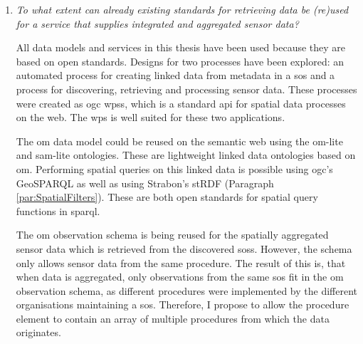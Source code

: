 \begin{enumerate}
However, the down side of the a detailed semantic knowledge base is that more data has to be transferred over the internet. First a \ac{sparql} query has to be made with a spatial filter, which includes verbose \ac{wkt} geometries. Then an \ac{rdf} document containing detailed information about each sensor is return, based on which \ac{sos} requests are performed. If only the addresses of \aclp{sos} are returned, which have sensors inside a certain bounding box, both the \ac{sparql} requests and responses are smaller. The detailed spatial query is then performed by the \aclp{sos} and does not require as much data to be transferred over the internet. 

Still, discovering sensors is only a matter of seconds using the a detailed semantic knowledge base. Automatically retrieving sensor data can take up to a couple minutes depending on the amount of sensors for which data is requested and the temporal range. However, it should be noted that performance optimisation is out of the scope of this thesis. It is likely that this can still be improved significantly in the future (see Chapter \ref{chap:futureResearch}).              

\item \textit{To what extent can already existing standards for retrieving data be (re)used for a service that supplies integrated and aggregated sensor data?}%

All data models and services in this thesis have been used because they are based on open standards. Designs for two processes have been explored: an automated process for creating linked data from metadata in a \ac{sos} and a process for discovering, retrieving and processing sensor data. These processes were created as \ac{ogc} \aclp{wps}, which is a standard \ac{api} for spatial data processes on the web. The \ac{wps} is well suited for these two applications.

The \ac{om} data model could be reused on the semantic web using the om-lite and sam-lite ontologies. These are lightweight linked data ontologies based on \ac{om}. Performing spatial queries on this linked data is possible using \ac{ogc}'s GeoSPARQL as well as using Strabon's stRDF (Paragraph \ref{par:SpatialFilters}). These are both open standards for spatial query functions in \ac{sparql}.

The \ac{om} observation schema is being reused for the spatially aggregated sensor data which is retrieved from the discovered \aclp{sos}. However, the schema only allows sensor data from the same procedure. The result of this is, that when data is aggregated, only observations from the same \ac{sos} fit in the \ac{om} observation schema, as different procedures were implemented by the different organisations maintaining a \ac{sos}. Therefore, I propose to allow the procedure element to contain an array of multiple procedures from which the data originates. 
\end{enumerate}

